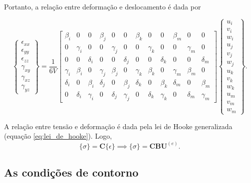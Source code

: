Portanto, a relação entre deformação e deslocamento é dada por

\begin{equation}
    \begin{Bmatrix}
        \epsilon_{xx} \\ \epsilon_{yy} \\ \epsilon_{zz} \\ \gamma_{xy} \\ \gamma_{xz} \\ \gamma_{yz}
    \end{Bmatrix} = \frac{1}{6V} 
    \begin{bmatrix}
\beta_i & 0 & 0 & \beta_j & 0 & 0 & \beta_k & 0 & 0 & \beta_m & 0 & 0 \\
0 & \gamma_i & 0 & 0 & \gamma_j & 0 & 0 & \gamma_k & 0 & 0 & \gamma_m & 0 \\
0 & 0 & \delta_i & 0 & 0 & \delta_j & 0 & 0 & \delta_k & 0 & 0 & \delta_m \\
\gamma_i & \beta_i & 0 & \gamma_j & \beta_j & 0 & \gamma_k & \beta_k & 0 & \gamma_m & \beta_m & 0 \\
\delta_i & 0 & \beta_i & \delta_j & 0 & \beta_j & \delta_k & 0 & \beta_k & \delta_m & 0 & \beta_m \\
0 & \delta_i & \gamma_i & 0 & \delta_j & \gamma_j & 0 & \delta_k & \gamma_k & 0 & \delta_m & \gamma_m
    \end{bmatrix} 
    \begin{Bmatrix}
        u_i \\ v_i \\ w_i \\ u_j \\ v_j \\ w_j \\ u_k \\ v_k \\ w_k \\ u_m \\ v_m \\ w_m
    \end{Bmatrix}.
\end{equation}

A relação entre tensão e deformação é dada pela lei de Hooke generalizada (equação \ref{eq:lei_de_hooke}). Logo,
\begin{equation}
    \{\sigma\} = \bm{C} \{\epsilon\} \implies \{\sigma\} = \bm{C} \bm{B} \bm{U}^{(e)}.
\end{equation}

\subsection{As condições de contorno}

